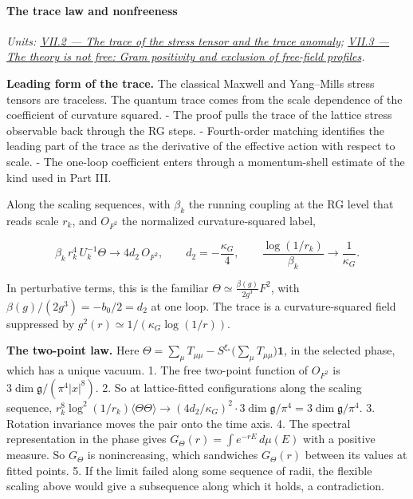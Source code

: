 \documentclass[
  letterpaper,
  11pt]{article}
\begin{document}
\paragraph{The trace law and
nonfreeness}\label{the-trace-law-and-nonfreeness}

\emph{Units:
\href{https://github.com/scottnarmstrong/yang-mills-informalization/blob/main/outline/units/VII-2.md}{VII.2
--- The trace of the stress tensor and the trace anomaly};
\href{https://github.com/scottnarmstrong/yang-mills-informalization/blob/main/outline/units/VII-3.md}{VII.3
--- The theory is not free: Gram positivity and exclusion of free-field
profiles}.}

\textbf{Leading form of the trace.} The classical Maxwell and
Yang--Mills stress tensors are traceless. The quantum trace comes from
the scale dependence of the coefficient of curvature squared. - The
proof pulls the trace of the lattice stress observable back through the
RG steps. - Fourth-order matching identifies the leading part of the
trace as the derivative of the effective action with respect to scale. -
The one-loop coefficient enters through a momentum-shell estimate of the
kind used in Part III.

Along the scaling sequences, with \(\beta_k\) the running coupling at
the RG level that reads scale \(r_k\), and \(O_{F^2}\) the normalized
curvature-squared label,

\[\beta_k\,r_k^4\,U_k^{-1}\Theta\longrightarrow4d_2\,O_{F^2},\qquad d_2=-\frac{\kappa_G}4,\qquad\frac{\log(1/r_k)}{\beta_k}\longrightarrow\frac1{\kappa_G}.\]

In perturbative terms, this is the familiar
\(\Theta\simeq\frac{\beta(g)}{2g^3}F^2\), with
\(\beta(g)/(2g^3)=-b_0/2=d_2\) at one loop. The trace is a
curvature-squared field suppressed by
\(g^2(r)\simeq1/(\kappa_G\log(1/r))\).

\textbf{The two-point law.} Here
\(\Theta=\sum_\mu T_{\mu\mu}-S^{\xi_\ast}\big(\sum_\mu T_{\mu\mu}\big)\mathbf1\),
in the selected phase, which has a unique vacuum. 1. The free two-point
function of \(O_{F^2}\) is \(3\dim\mathfrak g/(\pi^4|x|^8)\). 2. So at
lattice-fitted configurations along the scaling sequence,
\(r_k^8\log^2(1/r_k)\langle\Theta\Theta\rangle\to(4d_2/\kappa_G)^2\cdot3\dim\mathfrak g/\pi^4=3\dim\mathfrak g/\pi^4\).
3. Rotation invariance moves the pair onto the time axis. 4. The
spectral representation in the phase gives
\(G_\Theta(r)=\int e^{-rE}\,d\mu(E)\) with a positive measure. So
\(G_\Theta\) is nonincreasing, which sandwiches \(G_\Theta(r)\) between
its values at fitted points. 5. If the limit failed along some sequence
of radii, the flexible scaling above would give a subsequence along
which it holds, a contradiction.
\end{document}
